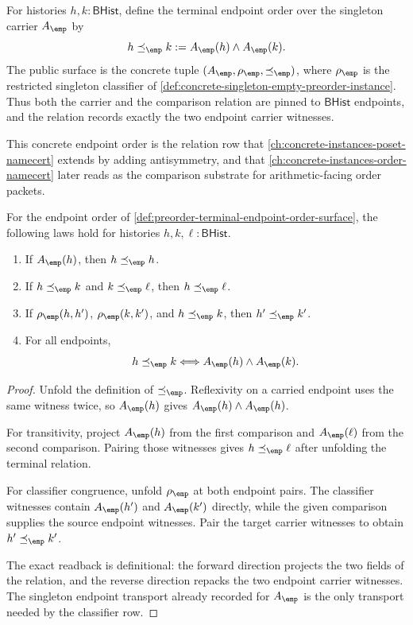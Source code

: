 \begin{definition}
\label{def:preorder-terminal-endpoint-order-surface}
For histories $h,k:\mathsf{BHist}$, define the terminal endpoint order over
the singleton carrier $A_{\emp}$ by
$$
h\preceq_{\emp} k:=A_{\emp}(h)\land A_{\emp}(k).
$$
The public surface is the concrete tuple
$(A_{\emp},\rho_{\emp},\preceq_{\emp})$, where $\rho_{\emp}$ is the
restricted singleton classifier of
\autoref{def:concrete-singleton-empty-preorder-instance}. Thus both the
carrier and the comparison relation are pinned to $\mathsf{BHist}$ endpoints,
and the relation records exactly the two endpoint carrier witnesses.
\end{definition}

This concrete endpoint order is the relation row that \autoref{ch:concrete-instances-poset-namecert} extends by adding antisymmetry, and that \autoref{ch:concrete-instances-order-namecert} later reads as the comparison substrate for arithmetic-facing order packets.

\begin{theorem}
\label{thm:preorder-terminal-endpoint-order-laws}
For the endpoint order of
\autoref{def:preorder-terminal-endpoint-order-surface}, the following laws
hold for histories $h,k,\ell:\mathsf{BHist}$.
\begin{enumerate}
\item If $A_{\emp}(h)$, then $h\preceq_{\emp} h$.
\item If $h\preceq_{\emp} k$ and $k\preceq_{\emp}\ell$, then
$h\preceq_{\emp}\ell$.
\item If $\rho_{\emp}(h,h')$, $\rho_{\emp}(k,k')$, and
$h\preceq_{\emp}k$, then $h'\preceq_{\emp}k'$.
\item For all endpoints,
$$
h\preceq_{\emp}k
\Longleftrightarrow
A_{\emp}(h)\land A_{\emp}(k).
$$
\end{enumerate}
\end{theorem}
\begin{proof}
Unfold the definition of $\preceq_{\emp}$. Reflexivity on a carried endpoint
uses the same witness twice, so $A_{\emp}(h)$ gives
$A_{\emp}(h)\land A_{\emp}(h)$.

For transitivity, project $A_{\emp}(h)$ from the first comparison and
$A_{\emp}(\ell)$ from the second comparison. Pairing those witnesses gives
$h\preceq_{\emp}\ell$ after unfolding the terminal relation.

For classifier congruence, unfold $\rho_{\emp}$ at both endpoint pairs. The
classifier witnesses contain $A_{\emp}(h')$ and $A_{\emp}(k')$ directly, while
the given comparison supplies the source endpoint witnesses. Pair the target
carrier witnesses to obtain $h'\preceq_{\emp}k'$.

The exact readback is definitional: the forward direction projects the two
fields of the relation, and the reverse direction repacks the two endpoint
carrier witnesses. The singleton endpoint transport already recorded for
$A_{\emp}$ is the only transport needed by the classifier row.
\end{proof}

